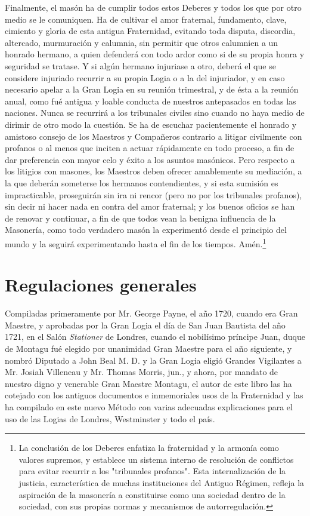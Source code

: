 \documentclass[a4paper,12pt,twoside]{book}
\newcommand{\manuscritosection}[1]{%
\section*{#1}
\addcontentsline{toc}{section}{#1}
}
\begin{document}
\noindent Finalmente, el masón ha de cumplir todos estos Deberes y todos los que por otro medio se le comuniquen. Ha de cultivar el amor fraternal, fundamento, clave, cimiento y gloria de esta antigua Fraternidad, evitando toda disputa, discordia, altercado, murmuración y calumnia, sin permitir que otros calumnien a un honrado hermano, a quien defenderá con todo ardor como si de su propia honra y seguridad se tratase. Y si algún hermano injuriase a otro, deberá el que se considere injuriado recurrir a su propia Logia o a la del injuriador, y en caso necesario apelar a la Gran Logia en su reunión trimestral, y de ésta a la reunión anual, como fué antigua y loable conducta de nuestros antepasados en todas las naciones. Nunca se recurrirá a los tribunales civiles sino cuando no haya medio de dirimir de otro modo la cuestión. Se ha de escuchar pacientemente el honrado y amistoso consejo de los Maestros y Compañeros contrario a litigar civilmente con profanos o al menos que inciten a actuar rápidamente en todo proceso, a fin de dar preferencia con mayor celo y éxito a los asuntos masónicos. Pero respecto a los litigios con masones, los Maestros deben ofrecer amablemente su mediación, a la que deberán someterse los hermanos contendientes, y si esta sumisión es impracticable, proseguirán sin ira ni rencor (pero no por los tribunales profanos), sin decir ni hacer nada en contra del amor fraternal; y los buenos oficios se han de renovar y continuar, a fin de que todos vean la benigna influencia de la Masonería, como todo verdadero masón la experimentó desde el principio del mundo y la seguirá experimentando hasta el fin de los tiempos. Amén.\footnote{La conclusión de los Deberes enfatiza la fraternidad y la armonía como valores supremos, y establece un sistema interno de resolución de conflictos para evitar recurrir a los "tribunales profanos". Esta internalización de la justicia, característica de muchas instituciones del Antiguo Régimen, refleja la aspiración de la masonería a constituirse como una sociedad dentro de la sociedad, con sus propias normas y mecanismos de autorregulación.}

\vspace{0.5cm}

\manuscritosection{Regulaciones generales}

\noindent Compiladas primeramente por Mr. George Payne, el año 1720, cuando era Gran Maestre, y aprobadas por la Gran Logia el día de San Juan Bautista del año 1721, en el Salón \textit{Stationer} de Londres, cuando el nobilísimo príncipe Juan, duque de Montagu fué elegido por unanimidad Gran Maestre para el año siguiente, y nombró Diputado a John Beal M. D. y la Gran Logia eligió Grandes Vigilantes a Mr. Josiah Villeneau y Mr. Thomas Morris, jun., y ahora, por mandato de nuestro digno y venerable Gran Maestre Montagu, el autor de este libro las ha cotejado con los antiguos documentos e inmemoriales usos de la Fraternidad y las ha compilado en este nuevo Método con varias adecuadas explicaciones para el uso de las Logias de Londres, Westminster y todo el país.

\vspace{0.3cm}
\end{document}
